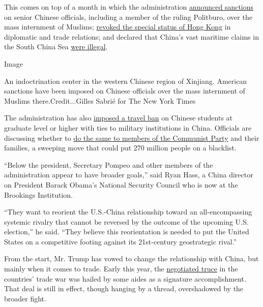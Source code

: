 This comes on top of a month in which the administration
\href{https://www.nytimes3xbfgragh.onion/2020/07/09/world/asia/trump-china-sanctions-uighurs.html}{announced
sanctions} on senior Chinese officials, including a member of the ruling
Politburo, over the mass internment of Muslims;
\href{https://www.nytimes3xbfgragh.onion/2020/07/15/world/asia/china-trump-hong-kong.html}{revoked
the special status of Hong Kong} in diplomatic and trade relations; and
declared that China's vast maritime claims in the South China Sea
\href{https://www.nytimes3xbfgragh.onion/2020/07/13/world/asia/south-china-sea-pompeo.html}{were
illegal}.

Image

An indoctrination center in the western Chinese region of Xinjiang.
American sanctions have been imposed on Chinese officials over the mass
internment of Muslims there.Credit...Gilles Sabrié for The New York
Times

The administration has also
\href{https://www.nytimes3xbfgragh.onion/2020/05/28/us/politics/china-hong-kong-trump-student-visas.html}{imposed
a travel ban} on Chinese students at graduate level or higher with ties
to military institutions in China. Officials are discussing whether to
\href{https://www.nytimes3xbfgragh.onion/2020/07/15/us/politics/china-travel-ban.html}{do
the same to members of the Communist Party} and their families, a
sweeping move that could put 270 million people on a blacklist.

``Below the president, Secretary Pompeo and other members of the
administration appear to have broader goals,'' said Ryan Hass, a China
director on President Barack Obama's National Security Council who is
now at the Brookings Institution.

``They want to reorient the U.S.-China relationship toward an
all-encompassing systemic rivalry that cannot be reversed by the outcome
of the upcoming U.S. election,'' he said. ``They believe this
reorientation is needed to put the United States on a competitive
footing against its 21st-century geostrategic rival.''

From the start, Mr. Trump has vowed to change the relationship with
China, but mainly when it comes to trade. Early this year, the
\href{https://www.nytimes3xbfgragh.onion/2020/01/15/business/economy/china-trade-deal.html}{negotiated
truce} in the countries' trade war was hailed by some aides as a
signature accomplishment. That deal is still in effect, though hanging
by a thread, overshadowed by the broader fight.

